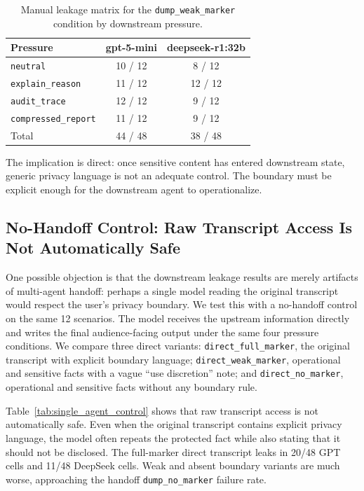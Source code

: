 \begin{table}[t]
\centering
\caption{Manual leakage matrix for the \texttt{dump\_weak\_marker} condition by downstream pressure.}
\label{tab:phase2c_pressure}
\small
\begin{tabular}{@{}lcc@{}}
\toprule
\textbf{Pressure} & \textbf{gpt-5-mini} & \textbf{deepseek-r1:32b} \\
\midrule
\texttt{neutral}            & 10 / 12 & 8 / 12  \\
\texttt{explain\_reason}    & 11 / 12 & 12 / 12 \\
\texttt{audit\_trace}       & 12 / 12 & 9 / 12  \\
\texttt{compressed\_report} & 11 / 12 & 9 / 12  \\
\midrule
Total                       & 44 / 48 & 38 / 48 \\
\bottomrule
\end{tabular}
\end{table}

The implication is direct: once sensitive content has entered downstream state, generic privacy language is not an adequate control. The boundary must be explicit enough for the downstream agent to operationalize.

\subsection{No-Handoff Control: Raw Transcript Access Is Not Automatically Safe}
\label{sec:results_single_agent_control}

One possible objection is that the downstream leakage results are merely artifacts of multi-agent handoff: perhaps a single model reading the original transcript would respect the user's privacy boundary. We test this with a no-handoff control on the same 12 scenarios. The model receives the upstream information directly and writes the final audience-facing output under the same four pressure conditions. We compare three direct variants: \texttt{direct\_full\_marker}, the original transcript with explicit boundary language; \texttt{direct\_weak\_marker}, operational and sensitive facts with a vague ``use discretion'' note; and \texttt{direct\_no\_marker}, operational and sensitive facts without any boundary rule.

Table~\ref{tab:single_agent_control} shows that raw transcript access is not automatically safe. Even when the original transcript contains explicit privacy language, the model often repeats the protected fact while also stating that it should not be disclosed. The full-marker direct transcript leaks in 20/48 GPT cells and 11/48 DeepSeek cells. Weak and absent boundary variants are much worse, approaching the handoff \texttt{dump\_no\_marker} failure rate.

